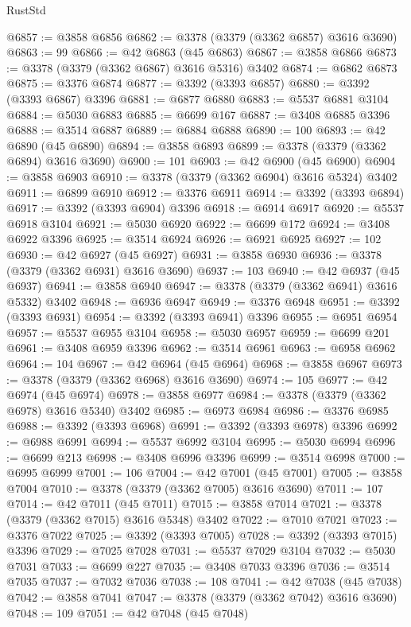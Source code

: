 \begin{lexlean}{RustStd}
\begin{coremodule}
@6857 := @3858 @6856
@6862 := @3378 (@3379 (@3362 @6857) @3616 @3690)
@6863 := 99
@6866 := @42 @6863 (@45 @6863)
@6867 := @3858 @6866
@6873 := @3378 (@3379 (@3362 @6867) @3616 @5316) @3402
@6874 := @6862 @6873
@6875 := @3376 @6874
@6877 := @3392 (@3393 @6857)
@6880 := @3392 (@3393 @6867) @3396
@6881 := @6877 @6880
@6883 := @5537 @6881 @3104
@6884 := @5030 @6883
@6885 := @6699 @167
@6887 := @3408 @6885 @3396
@6888 := @3514 @6887
@6889 := @6884 @6888
@6890 := 100
@6893 := @42 @6890 (@45 @6890)
@6894 := @3858 @6893
@6899 := @3378 (@3379 (@3362 @6894) @3616 @3690)
@6900 := 101
@6903 := @42 @6900 (@45 @6900)
@6904 := @3858 @6903
@6910 := @3378 (@3379 (@3362 @6904) @3616 @5324) @3402
@6911 := @6899 @6910
@6912 := @3376 @6911
@6914 := @3392 (@3393 @6894)
@6917 := @3392 (@3393 @6904) @3396
@6918 := @6914 @6917
@6920 := @5537 @6918 @3104
@6921 := @5030 @6920
@6922 := @6699 @172
@6924 := @3408 @6922 @3396
@6925 := @3514 @6924
@6926 := @6921 @6925
@6927 := 102
@6930 := @42 @6927 (@45 @6927)
@6931 := @3858 @6930
@6936 := @3378 (@3379 (@3362 @6931) @3616 @3690)
@6937 := 103
@6940 := @42 @6937 (@45 @6937)
@6941 := @3858 @6940
@6947 := @3378 (@3379 (@3362 @6941) @3616 @5332) @3402
@6948 := @6936 @6947
@6949 := @3376 @6948
@6951 := @3392 (@3393 @6931)
@6954 := @3392 (@3393 @6941) @3396
@6955 := @6951 @6954
@6957 := @5537 @6955 @3104
@6958 := @5030 @6957
@6959 := @6699 @201
@6961 := @3408 @6959 @3396
@6962 := @3514 @6961
@6963 := @6958 @6962
@6964 := 104
@6967 := @42 @6964 (@45 @6964)
@6968 := @3858 @6967
@6973 := @3378 (@3379 (@3362 @6968) @3616 @3690)
@6974 := 105
@6977 := @42 @6974 (@45 @6974)
@6978 := @3858 @6977
@6984 := @3378 (@3379 (@3362 @6978) @3616 @5340) @3402
@6985 := @6973 @6984
@6986 := @3376 @6985
@6988 := @3392 (@3393 @6968)
@6991 := @3392 (@3393 @6978) @3396
@6992 := @6988 @6991
@6994 := @5537 @6992 @3104
@6995 := @5030 @6994
@6996 := @6699 @213
@6998 := @3408 @6996 @3396
@6999 := @3514 @6998
@7000 := @6995 @6999
@7001 := 106
@7004 := @42 @7001 (@45 @7001)
@7005 := @3858 @7004
@7010 := @3378 (@3379 (@3362 @7005) @3616 @3690)
@7011 := 107
@7014 := @42 @7011 (@45 @7011)
@7015 := @3858 @7014
@7021 := @3378 (@3379 (@3362 @7015) @3616 @5348) @3402
@7022 := @7010 @7021
@7023 := @3376 @7022
@7025 := @3392 (@3393 @7005)
@7028 := @3392 (@3393 @7015) @3396
@7029 := @7025 @7028
@7031 := @5537 @7029 @3104
@7032 := @5030 @7031
@7033 := @6699 @227
@7035 := @3408 @7033 @3396
@7036 := @3514 @7035
@7037 := @7032 @7036
@7038 := 108
@7041 := @42 @7038 (@45 @7038)
@7042 := @3858 @7041
@7047 := @3378 (@3379 (@3362 @7042) @3616 @3690)
@7048 := 109
@7051 := @42 @7048 (@45 @7048)

\end{coremodule}
\end{lexlean}
